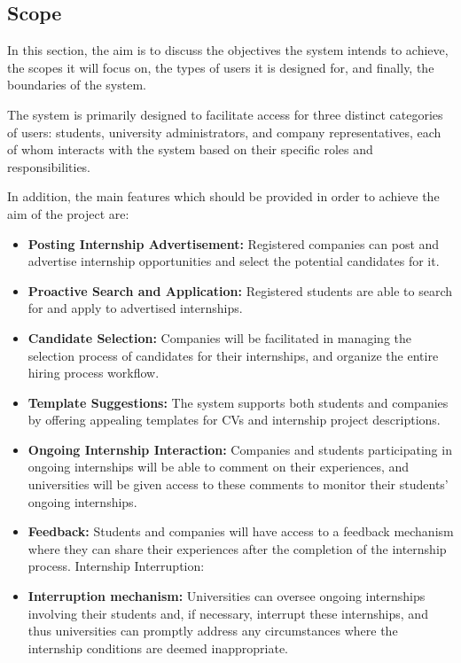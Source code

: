 \documentclass{article}
\begin{document}
\subsection{Scope}
In this section, the aim is to discuss the objectives the system intends to achieve, the scopes it will focus on, the types of users it is designed for, and finally, the boundaries of the system.

The system is primarily designed to facilitate access for three distinct categories of users: students, university administrators, and company representatives, each of whom interacts with the system based on their specific roles and responsibilities.

In addition, the main features which should be provided in order to achieve the aim of the project are:
   \begin{itemize}
\item \textbf {Posting Internship Advertisement:} Registered companies can post and advertise internship opportunities and select the potential candidates for it.
\item \textbf {Proactive Search and Application:} Registered students are able to search for and apply to advertised internships.
 \item \textbf {Candidate Selection:} Companies will be facilitated in managing the selection process of candidates for their internships, and organize the entire hiring process workflow.
 \item \textbf {Template Suggestions:} The system supports both students and companies by offering appealing templates for CVs and internship project descriptions.
  \item \textbf {Ongoing Internship Interaction:} Companies and students participating in ongoing internships will be able to comment on their experiences, and universities will be given access to these comments to monitor their students' ongoing internships.
 \item \textbf {Feedback:} Students and companies will have access to a feedback mechanism where they can share their experiences after the completion of the internship process.
 Internship Interruption:
\item \textbf {Interruption mechanism:} Universities can oversee ongoing internships involving their students and, if necessary, interrupt these internships, and thus universities can promptly address any circumstances where the internship conditions are deemed inappropriate.
   \end{itemize}
\end{document}
